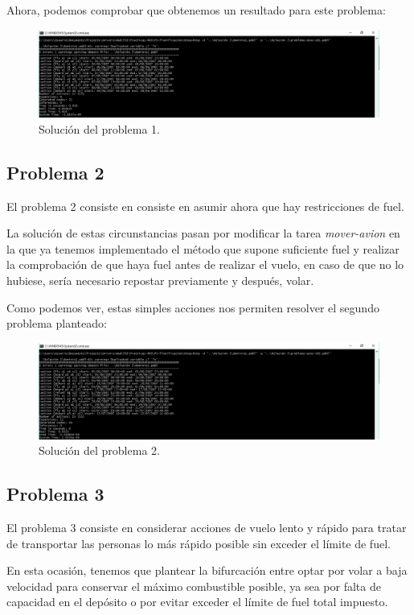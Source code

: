 \documentclass[a4paper, 11pt]{article}
\begin{document}
		Ahora, podemos comprobar que obtenemos un resultado para este problema:
		\begin{figure}[H]
			\centering
			\includegraphics[width=15cm]{Ej1-Problema1.png}
			\caption{Solución del problema 1.}
			\label{Prob-1}
		\end{figure}
		
	\subsection{Problema 2}
		El problema 2 consiste en consiste en asumir ahora que hay restricciones de fuel.
		
		La solución de estas circunstancias pasan por modificar la tarea \textit{mover-avion} en la que ya tenemos
		implementado el método que supone suficiente fuel y realizar la comprobación de que haya fuel antes de
		realizar el vuelo, en caso de que no lo hubiese, sería necesario repostar previamente y después, volar.
		
		Como podemos ver, estas simples acciones nos permiten resolver el segundo problema planteado:
		\begin{figure}[H]
			\centering
			\includegraphics[width=15cm]{Ej1-Problema2.png}
			\caption{Solución del problema 2.}
			\label{Prob-2}
		\end{figure}
		
	\subsection{Problema 3}
		El problema 3 consiste en considerar acciones de vuelo lento y rápido para tratar de transportar las
		personas lo más rápido posible sin exceder el límite de fuel.
		
		En esta ocasión, tenemos que plantear la bifurcación entre optar por volar a baja velocidad para
		conservar el máximo combustible posible, ya sea por falta de capacidad en el depósito o por evitar
		exceder el límite de fuel total impuesto.
		
\end{document}
